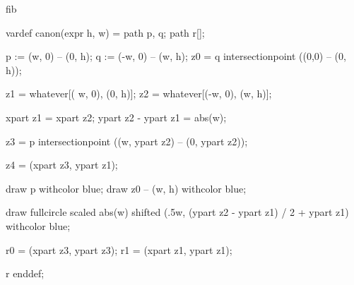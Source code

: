 

\startenvironment fib

	\startMPdefinitions
		vardef canon(expr h, w) =
			path p, q;
			path r[];

			p := (w,  0) -- (0, h); %
			q := (-w, 0) -- (w, h); %
			z0 = q intersectionpoint ((0,0) -- (0, h)); %

			z1 = whatever[( w, 0), (0, h)]; %
			z2 = whatever[(-w, 0), (w, h)]; %

			xpart z1 = xpart z2;
			ypart z2 - ypart z1 = abs(w);

			z3 = p intersectionpoint ((w, ypart z2) -- (0, ypart z2)); %

			z4 = (xpart z3, ypart z1); %

			draw p withcolor blue;
			draw z0 -- (w, h) withcolor blue;

			draw fullcircle scaled abs(w) shifted (.5w, (ypart z2 - ypart z1) / 2 + ypart z1) withcolor blue;



			r0 = (xpart z3, ypart z3); %
			r1 = (xpart z1, ypart z1); %

			r
		enddef;
	\stopMPdefinitions

\stopenvironment

